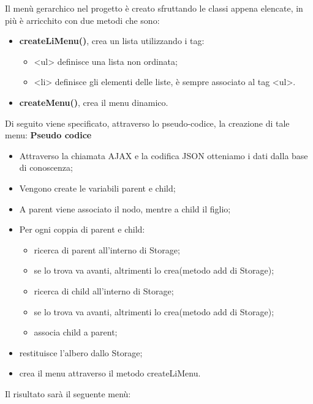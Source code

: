 \documentclass[a4paper,11pt]{article}
\begin{document}
Il menù gerarchico nel progetto è creato sfruttando le classi appena elencate, in più è arricchito con due metodi che sono:
\begin{itemize}
	\item \textbf{createLiMenu()}, crea un lista utilizzando i tag:
	\begin{itemize}
		\item <ul> definisce una lista non ordinata;
		\item <li> definisce gli elementi delle liste, è sempre associato al tag <ul>.
	\end{itemize}
	\item \textbf{createMenu()}, crea il menu dinamico.
\end{itemize}
Di seguito viene specificato, attraverso lo pseudo-codice, la creazione di tale menu:\newline
\textbf{Pseudo codice}
	\begin{itemize}
	\item Attraverso la chiamata AJAX e la codifica JSON otteniamo i dati dalla base di conoscenza;
	\item Vengono create le variabili parent e child;
	\item A parent viene associato il nodo, mentre a child il figlio;
	\item Per ogni coppia di parent e child:
		\begin{itemize}
		\item ricerca di parent all'interno di Storage; 
		\item se lo trova va avanti, altrimenti lo crea(metodo add di Storage);
		\item ricerca di child all'interno di Storage;
		\item se lo trova va avanti, altrimenti lo crea(metodo add di Storage);
		\item associa child a parent;
		
		\end{itemize}		
	\item restituisce l'albero dallo Storage;
	\item crea il menu attraverso il metodo createLiMenu.
	\end{itemize} 	
Il risultato sarà il seguente menù:
\end{document}
